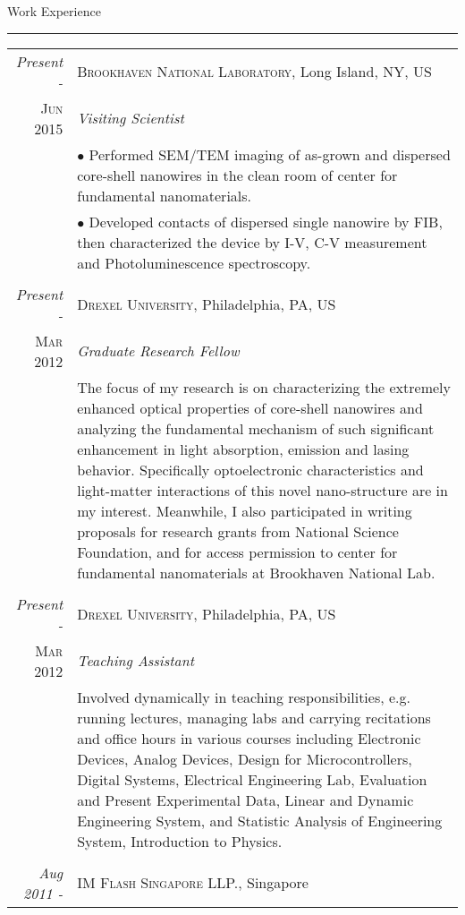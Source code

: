 \begin{vita}
{\Large\scshape\raggedright{Work Experience}}
\newline
\rule{\textwidth}{1pt}
\begin{tabular}{r|p{11cm}}
 \emph{Present -} & \textsc{Brookhaven National Laboratory}, Long Island, NY, US \\\textsc{Jun 2015}&\emph{Visiting Scientist}\\& \footnotesize{$\bullet$ Performed SEM/TEM imaging of as-grown and dispersed core-shell nanowires in the clean room of center for fundamental nanomaterials.} 
\\& \footnotesize{$\bullet$ Developed contacts of dispersed single nanowire by FIB, then characterized the device by I-V, C-V measurement and Photoluminescence spectroscopy.}\\
 \multicolumn{2}{c}{} \\
 \emph{Present -} & \textsc{Drexel University}, Philadelphia, PA, US \\
 \textsc{Mar 2012} &\emph{Graduate Research Fellow}\\& \footnotesize{
The focus of my research is on characterizing the extremely enhanced optical properties of core-shell nanowires and analyzing the fundamental mechanism of such significant enhancement in light absorption, emission and lasing behavior. Specifically optoelectronic characteristics and light-matter interactions of this novel nano-structure are in my interest. Meanwhile, I also participated in writing proposals for research grants from National Science Foundation, and for access permission to center for fundamental nanomaterials at Brookhaven National Lab.}\\
 \multicolumn{2}{c}{} \\
 \emph{Present -} & \textsc{Drexel University}, Philadelphia, PA, US \\
 \textsc{Mar 2012} &\emph{Teaching Assistant}\\&\footnotesize{Involved dynamically in teaching responsibilities, e.g. running lectures, managing labs and carrying recitations and office hours in various courses including Electronic Devices, Analog Devices, Design for Microcontrollers, Digital Systems, Electrical Engineering Lab, Evaluation and Present Experimental Data, Linear and Dynamic Engineering System, and Statistic Analysis of Engineering System, Introduction to Physics.}\\
 \multicolumn{2}{c}{} \\
\emph{Aug 2011 -} & \textsc{IM Flash Singapore LLP.}, Singapore \\

\end{tabular}
\end{vita}
